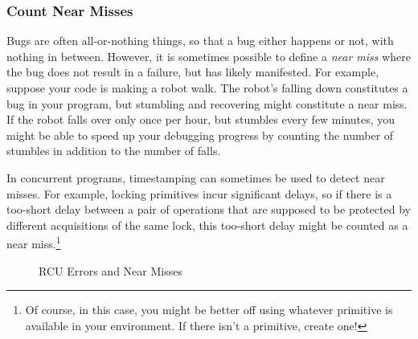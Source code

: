 \QuickQuizEnd

\subsubsection{Count Near Misses}
\label{sec:debugging:Count Near Misses}

Bugs are often all-or-nothing things, so that a bug either happens
or not, with nothing in between.
However, it is sometimes possible to define a \emph{near miss} where
the bug does not result in a failure, but has likely manifested.
For example, suppose your code is making a robot walk.
The robot's falling down constitutes a bug in your program, but
stumbling and recovering might constitute a near miss.
If the robot falls over only once per hour, but stumbles every few
minutes, you might be able to speed up your debugging progress by
counting the number of stumbles in addition to the number of falls.

In concurrent programs, timestamping can sometimes be used to detect
near misses.
For example, locking primitives incur significant delays, so if there is
a too-short delay between a pair of operations that are supposed
to be protected by different acquisitions of the same lock, this too-short
delay might be counted as a near miss.\footnote{
	Of course, in this case, you might be better off using
	whatever  primitive is available
	in your environment.
	If there isn't a  primitive, create one!}

\begin{figure}
\centering
{}
\caption{RCU Errors and Near Misses}
\label{fig:debugging:RCU Errors and Near Misses}
\end{figure}

